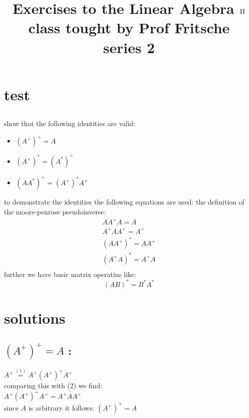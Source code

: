 \documentclass[a4paper,10pt]{article}
\title{Exercises to the Linear Algebra $\RN{2}$ class tought by Prof Fritsche\\
series 2}
\author{}
\begin{document}
\section{test}

\setcounter{section}{1}
\subsection{}
show that the following identities are valid:
\begin{itemize}
	\item $ (A^+)^+=A$
	\item $ (A^+)^*=(A^*)^+$
	\item $ (AA^*)^+=(A^+)^*A^+$
		
\end{itemize}
to demonstrate the identities the following equations are used:
the definition of the moore-penrose pseudoinverse:
\begin{align}
	A A^+ A = A \\
	A^+ A A^+ = A^+ \\
	(A A^+)^* = A A^+ \\
	(A^+ A)^*=A^+ A \\
\end{align}
further we have basic matrix operatins like:
\begin{equation}
	(AB)^*=B^*A^*
\end{equation}
\section*{solutions}
\subsection*{$(A^+)^+=A$ :}
$A^+\stackrel{(1)}{=} A^+(A^+)^+A^+$\\
comparing this  with (2) we find:\\
$ A^+(A^+)^+A^+ = A^+AA^+$\\
since $A$ is arbitrary it follows: $(A^+)^+=A$
\end{document}

